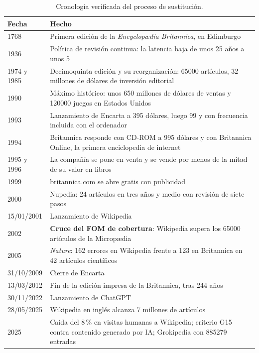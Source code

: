 \documentclass[11pt,letterpaper]{article}
\begin{document}
\begin{table}[ht]
  \centering
  \small
  \caption{Cronología verificada del proceso de sustitución.}
  \label{tab:crono}
  \begin{tabularx}{\textwidth}{@{}l >{\raggedright\arraybackslash}X@{}}
    \toprule
    \textbf{Fecha} & \textbf{Hecho} \\
    \midrule
    1768 & Primera edición de la \emph{Encyclopædia Britannica}, en Edimburgo \\
    1936 & Política de revisión continua: la latencia baja de unos 25 años a
      unos 5 \\
    1974 y 1985 & Decimoquinta edición y su reorganización: \num{65000}
      artículos, 32 millones de dólares de inversión editorial \\
    1990 & Máximo histórico: unos 650 millones de dólares de ventas y
      \num{120000} juegos en Estados Unidos \\
    1993 & Lanzamiento de Encarta a 395 dólares, luego 99 y con frecuencia
      incluida con el ordenador \\
    1994 & Britannica responde con CD-ROM a 995 dólares y con Britannica
      Online, la primera enciclopedia de internet \\
    1995 y 1996 & La compañía se pone en venta y se vende por menos de la mitad
      de su valor en libros \\
    1999 & britannica.com se abre gratis con publicidad \\
    2000 & Nupedia: 24 artículos en tres años y medio con revisión de siete
      pasos \\
    15/01/2001 & Lanzamiento de Wikipedia \\
    2002 & \textbf{Cruce del FOM de cobertura}: Wikipedia supera los
      \num{65000} artículos de la Micropædia \\
    2005 & \emph{Nature}: 162 errores en Wikipedia frente a 123 en Britannica
      en 42 artículos científicos \\
    31/10/2009 & Cierre de Encarta \\
    13/03/2012 & Fin de la edición impresa de la Britannica, tras 244 años \\
    30/11/2022 & Lanzamiento de ChatGPT \\
    28/05/2025 & Wikipedia en inglés alcanza 7 millones de artículos \\
    2025 & Caída del 8\,\% en visitas humanas a Wikipedia; criterio G15 contra
      contenido generado por IA; Grokipedia con \num{885279} entradas \\
    \bottomrule
  \end{tabularx}
\end{table}
\end{document}
